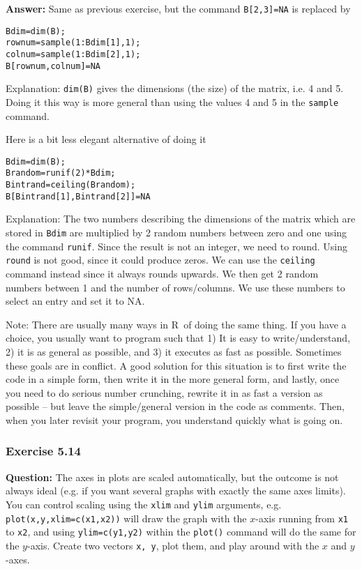 \documentclass [11pt]{article}
\newcommand{\code}[1]{{\tt #1}}
\newcommand\R{{\sf R}}
\begin{document}
\textbf{Answer:} Same as previous exercise, but the command \code{B[2,3]=NA} is replaced by
\begin{verbatim}
Bdim=dim(B);  
rownum=sample(1:Bdim[1],1);
colnum=sample(1:Bdim[2],1);
B[rownum,colnum]=NA
\end{verbatim}
Explanation: \code{dim(B)} gives the dimensions (the size) of the matrix, i.e. 4 and 5. Doing it this way is more general than using the values 4 and 5 in the \code{sample} command.

Here is a bit less elegant alternative of doing it
\begin{verbatim}
Bdim=dim(B);  
Brandom=runif(2)*Bdim; 
Bintrand=ceiling(Brandom); 
B[Bintrand[1],Bintrand[2]]=NA
\end{verbatim}
Explanation: The two numbers describing the dimensions of the matrix which are stored in \code{Bdim} are multiplied by 2 random numbers between zero and one using the command \code{runif}. Since the result is not an integer, we need to round. Using \code{round} is not good, since it could produce zeros. We can use the \code{ceiling} command instead since it always rounds upwards. We then get 2 random numbers between 1 and the number of rows/columns. We use these numbers to select an entry and set it to NA.

Note: There are usually many ways in \R\ of doing the same thing. If you have a choice, you usually want to program such that 1) It is easy to write/understand, 2) it is as general as possible, and 3) it executes as fast as possible. Sometimes these goals are in conflict. A good solution for this situation is to first write the code in a simple form, then write it in the more general form, and lastly, once you need to do serious number crunching, rewrite it in as fast a version as possible -- but leave the simple/general version in the code as comments. Then, when you later revisit your program, you understand quickly what is going on.

\subsubsection*{Exercise 5.14}
\textbf{Question:}
The axes in plots are scaled automatically, but the outcome is
not always ideal (e.g. if you want several graphs with exactly the
same axes limits). You can control scaling using the \code{xlim} and \code{ylim}
arguments, e.g. \code{plot(x,y,xlim=c(x1,x2))} will draw the graph with the $x$-axis running from \code{x1} to \code{x2}, and using 
\code{ylim=c(y1,y2)} within the \code{plot()} command will 
do the same for the $y$-axis. Create two vectors \code{x, y}, plot them, and play around with the $x$ and $y$-axes. 
\end{document}
